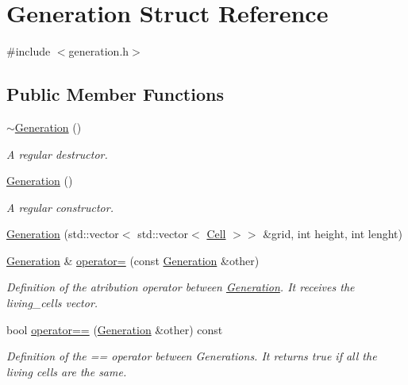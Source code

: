 \hypertarget{structGeneration}{}\section{Generation Struct Reference}
\label{structGeneration}


{\ttfamily \#include $<$generation.\+h$>$}

\subsection*{Public Member Functions}
\begin{DoxyCompactItemize}
\item 
\mbox{\label{structGeneration_abdcfe29ff21c942838e29727a25328a3}} 
\hyperlink{structGeneration_abdcfe29ff21c942838e29727a25328a3}{$\sim$\+Generation} ()
\begin{DoxyCompactList}\small\item\em A regular destructor. \end{DoxyCompactList}\item 
\mbox{\label{structGeneration_af78b660ea3c536b52a4f76af648a209b}} 
\hyperlink{structGeneration_af78b660ea3c536b52a4f76af648a209b}{Generation} ()
\begin{DoxyCompactList}\small\item\em A regular constructor. \end{DoxyCompactList}\item 
\hyperlink{structGeneration_a8e45e78fc1b9bcd513d58281a425baba}{Generation} (std\+::vector$<$ std\+::vector$<$ \hyperlink{structCell}{Cell} $>$$>$ \&grid, int height, int lenght)
\item 
\mbox{\label{structGeneration_ad1b9349ea377d96c972c6f53008acf04}} 
\hyperlink{structGeneration}{Generation} \& \hyperlink{structGeneration_ad1b9349ea377d96c972c6f53008acf04}{operator=} (const \hyperlink{structGeneration}{Generation} \&other)
\begin{DoxyCompactList}\small\item\em Definition of the atribution operator between \hyperlink{structGeneration}{Generation}. It receives the living\+\_\+cells vector. \end{DoxyCompactList}\item 
\mbox{\label{structGeneration_a15f9db07b1f6f40b05c0b3f2d911604e}} 
bool \hyperlink{structGeneration_a15f9db07b1f6f40b05c0b3f2d911604e}{operator==} (\hyperlink{structGeneration}{Generation} \&other) const
\begin{DoxyCompactList}\small\item\em Definition of the == operator between Generations. It returns true if all the living cells are the same. \end{DoxyCompactList}\end{DoxyCompactItemize}

